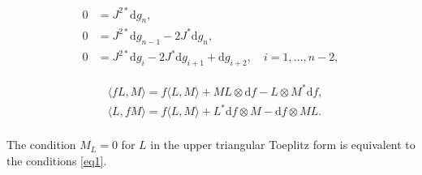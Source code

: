 \documentclass[10pt,a4paper]{amsart}
\newcommand{\ddd}{\mathrm{d}}
\begin{document}
    \begin{equation}\label{eq1}
    \begin{aligned}
    0 & = J^{2*} \ddd g_n, \\
    0 & = J^{2*} \ddd g_{n - 1} - 2 J^* \ddd g_n, \\
    0 & = J^{2*} \ddd g_i - 2 J^* \ddd g_{i + 1} + \ddd g_{i + 2}, \quad i = 1, \dots, n - 2,
    \end{aligned}    
    \end{equation}

\begin{equation}\label{ii:tensor}
    \begin{aligned}
       & \langle f L, M \rangle = f \langle L, M \rangle + M L \otimes \ddd f - L \otimes M^* \ddd f, \\
       & \langle L, f M \rangle = f \langle L, M \rangle + L^* \ddd f \otimes M - \ddd f \otimes ML. \\
\end{aligned}
\end{equation}    

\begin{Lemma}\label{lm2}
The condition $M_L = 0$ for $L$ in the upper triangular Toeplitz form is equivalent to the conditions \eqref{eq1}.
\end{Lemma}
\end{document}
